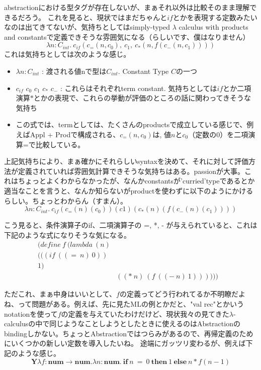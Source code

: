 \documentclass[9pt,fleqn]{jarticle}
\begin{document}
abstractionにおける型タグが存在しないが、まぁそれ以外は比較そのまま理解できるだろう。
これを見ると、現状ではまだちゃんと$if$とかを表現する定数みたいなのは出てきてないが、気持ちとしてはsimply-typed $\lambda$ calculus with products and constantsで定義できそうな雰囲気になる（らしいです、僕はなりません）
\begin{equation}\label{fact_lambda}
	\lambda n : C_{int}.\ c_{if}(c_{=}(n, c_0),\ c_1,\ c_*(n, f(c_{-}(n, c_1))))
\end{equation}
これは気持ちとしては次のような感じ。

\begin{itemize}
	\item $\lambda n:C_{int}$ : 渡される値nで型は$C_{int}$. Constant Type $C$の一つ
	\item $c_{if}$ $c_0$ $c_1$ $c_*$ $c_-$ : これらはそれぞれterm constant. 気持ちとしては$if$とか二項演算$*$とかの表現で、これらの挙動が評価のところの話に関わってきそうな気持ち
	\item この式では、termとしては、たくさんのproductsで成立している感じで、例えばAppl + Prodで構成される、$c_{=}(n, c_0)$は, 値$n$と$c_0$（定数の0）を二項演算=で比較している。
\end{itemize}

上記気持ちにより、まぁ確かにそれらしいsyntaxを決めて、それに対して評価方法が定義されていれば雰囲気計算できそうな気持ちはある。passionが大事。これはちょっとよくわからなかったが、なんかconstantsが'curried'typeであるとか適当なことを言うと、なんか知らないがproductを使わずに以下のようにかけるらしい。ちょっとわからん（すまん）。
\begin{equation*}
	\lambda n : C_{int}.\ c_{if}(c_{=}(n)(c_0))(c1)(c_{*}(n)(f(c_{-}(n)(c_{1}))))
\end{equation*}

こう見ると、条件演算子のif、二項演算子の =, *, - が与えられていると、これは下記のような式になりそうな気になる。
\begin{eqnarray*}
	(define\ f\ (lambda\ (n) & & \\
	(((if\ ((=\ n)\ 0)) & & \\
	1) & & \\
	& ((*\ n)\ (f\ ((-\ n)\ 1)))))) & 
\end{eqnarray*}

ただこれ、まぁ中身はいいとして、$f$の定義ってどう行われてるか不明瞭だよね、って問題がある。例えば、先に見たMLの例とかだと、"val rec"とかいうnotationを使って$f$の定義を与えていたわけだけど、現状我々の見てきた$\lambda$-calculusの中で同じようなことしようとしたときに使えるのはAbstractionのbindingしかない。ちょっとAbstractionではつらみがあるので、再帰定義のためにいくつかの新しい定数を導入したいね。
途端にガッツリ変わるが、例えば下記のような感じ。
\begin{equation}\label{y-conbinator}
	\bm{Y} \lambda f: \bm{num}\rightarrow\bm{num}. \lambda n:\bm{num}.\ \bm{if}\ n\ =\ 0\ \bm{then}\ 1\ \bm{else}\ n*f(n-1)
\end{equation}
\end{document}
